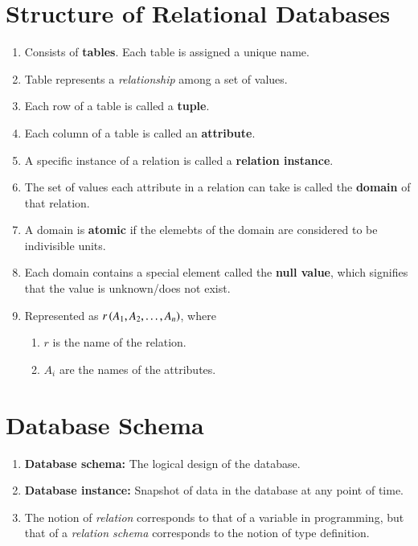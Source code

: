 \documentclass[journal,12pt,twocolumn]{IEEEtran}
\begin{document}
\section{Structure of Relational Databases}
\begin{enumerate}
    \item Consists of \textbf{tables}. Each table is assigned a unique name.
    \item Table represents a \textit{relationship} among a set of values.
    \item Each row of a table is called a \textbf{tuple}.
    \item Each column of a table is called an \textbf{attribute}.
    \item A specific instance of a relation is called a \textbf{relation instance}.
    \item The set of values each attribute in a relation can take is called the
    \textbf{domain} of that relation.
    \item A domain is \textbf{atomic} if the elemebts of the domain are 
    considered to be indivisible units.
    \item Each domain contains a special element called the \textbf{null value},
    which signifies that the value is unknown/does not exist.
    \item Represented as $r\left(A_1, A_2, \ldots, A_n\right)$, where
    \begin{enumerate}
        \item $r$ is the name of the relation.
        \item $A_i$ are the names of the attributes.
    \end{enumerate}
\end{enumerate}

\section{Database Schema}
\begin{enumerate}
    \item \textbf{Database schema:} The logical design of the database.
    \item \textbf{Database instance:} Snapshot of data in the database at any 
    point of time.
    \item The notion of \textit{relation} corresponds to that of a variable in 
    programming, but that of a \textit{relation schema} corresponds to the 
    notion of type definition.
\end{enumerate}
\end{document}
